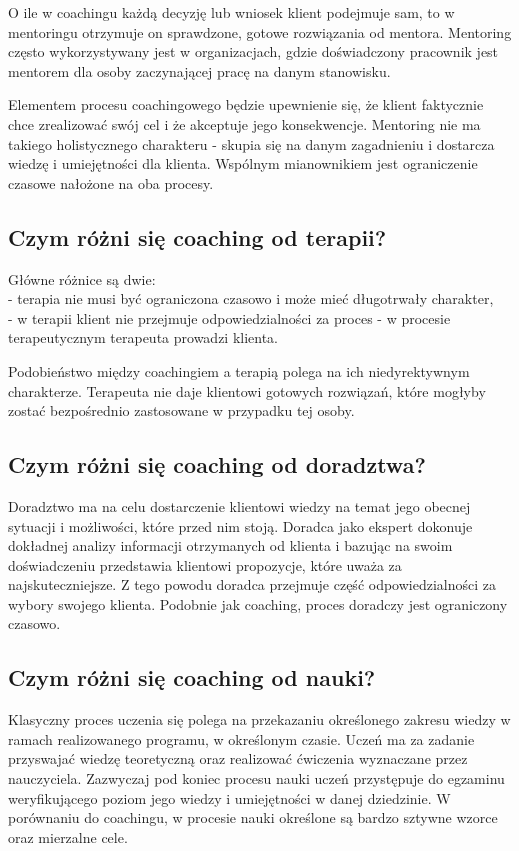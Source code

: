O ile w coachingu każdą decyzję lub wniosek klient podejmuje sam, to w mentoringu otrzymuje on sprawdzone, gotowe rozwiązania od mentora.
Mentoring często wykorzystywany jest w organizacjach, gdzie doświadczony pracownik jest mentorem dla osoby zaczynającej pracę na danym stanowisku.

Elementem procesu coachingowego będzie upewnienie się, że klient faktycznie chce zrealizować swój cel i że akceptuje jego konsekwencje.
Mentoring nie ma takiego holistycznego charakteru - skupia się na danym zagadnieniu i dostarcza wiedzę i umiejętności dla klienta.
Wspólnym mianownikiem jest ograniczenie czasowe nałożone na oba procesy.

\subsection{Czym różni się coaching od terapii?}
Główne różnice są dwie: \\
- terapia nie musi być ograniczona czasowo i może mieć długotrwały charakter, \\
- w terapii klient nie przejmuje odpowiedzialności za proces - w procesie terapeutycznym terapeuta prowadzi klienta.

Podobieństwo między coachingiem a terapią polega na ich niedyrektywnym charakterze. Terapeuta nie daje klientowi gotowych rozwiązań, które mogłyby
zostać bezpośrednio zastosowane w przypadku tej osoby.

\subsection{Czym różni się coaching od doradztwa?}
Doradztwo ma na celu dostarczenie klientowi wiedzy na temat jego obecnej sytuacji i możliwości, które przed nim stoją. Doradca jako ekspert dokonuje
dokładnej analizy informacji otrzymanych od klienta i bazując na swoim doświadczeniu przedstawia klientowi propozycje, które uważa za najskuteczniejsze.
Z tego powodu doradca przejmuje część odpowiedzialności za wybory swojego klienta. Podobnie jak coaching, proces doradczy jest ograniczony czasowo.

\subsection{Czym różni się coaching od nauki?}

Klasyczny proces uczenia się polega na przekazaniu określonego zakresu wiedzy w ramach realizowanego programu, w określonym czasie. Uczeń ma za zadanie
przyswajać wiedzę teoretyczną oraz realizować ćwiczenia wyznaczane przez nauczyciela. Zazwyczaj pod koniec procesu nauki uczeń przystępuje do egzaminu
weryfikującego poziom jego wiedzy i umiejętności w danej dziedzinie. W porównaniu do coachingu, w procesie nauki określone są bardzo sztywne wzorce
oraz mierzalne cele.

